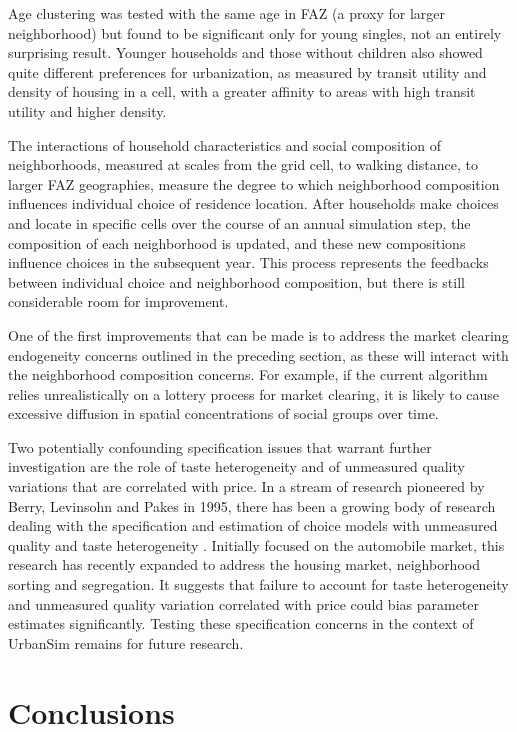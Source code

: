 \documentclass[12pt,a4paper]{article}
\begin{document}
Age clustering was tested with the same age in FAZ (a proxy for
larger neighborhood) but found to be significant only for young
singles, not an entirely surprising result.  Younger households
and those without children also showed quite different preferences
for urbanization, as measured by transit utility and density of
housing in a cell, with a greater affinity to areas with high
transit utility and higher density.

The interactions of household characteristics and social
composition of neighborhoods, measured at scales from the grid
cell, to walking distance, to larger FAZ geographies, measure the
degree to which neighborhood composition influences individual
choice of residence location.  After households make choices and
locate in specific cells over the course of an annual simulation
step, the composition of each neighborhood is updated, and these
new compositions influence choices in the subsequent year. This
process represents the feedbacks between individual choice and
neighborhood composition, but there is still considerable room for
improvement.

One of the first improvements that can be made is to address the
market clearing endogeneity concerns outlined in the preceding
section, as these will interact with the neighborhood composition
concerns.  For example, if the current algorithm relies
unrealistically on a lottery process for market clearing, it is
likely to cause excessive diffusion in spatial concentrations of
social groups over time.

Two potentially confounding specification issues that warrant
further investigation are the role of taste heterogeneity and of
unmeasured quality variations that are correlated with price.  In
a stream of research pioneered by Berry, Levinsohn and Pakes in
1995, there has been a growing body of research dealing with the
specification and estimation of choice models with unmeasured
quality and taste heterogeneity
\cite{berry-econometrica-1995,berry-cowles-2003}. Initially
focused on the automobile market, this research has recently
expanded to address the housing market, neighborhood sorting and
segregation. It suggests that failure to account for taste
heterogeneity and unmeasured quality variation correlated with
price could bias parameter estimates significantly. Testing these
specification concerns in the context of UrbanSim remains for
future research.


\section{Conclusions}
\end{document}
